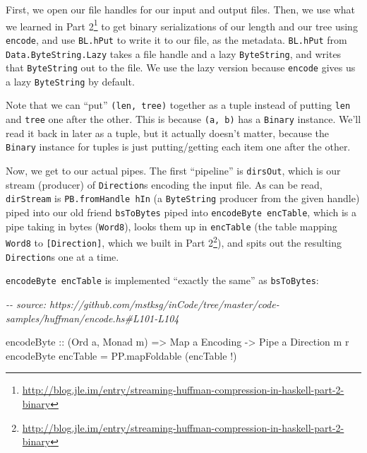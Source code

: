 \documentclass[]{article}
\newenvironment{Shaded}{}{}
\newcommand{\CommentTok}[1]{\textcolor[rgb]{0.38,0.63,0.69}{\textit{#1}}}
\newcommand{\DataTypeTok}[1]{\textcolor[rgb]{0.56,0.13,0.00}{#1}}
\newcommand{\NormalTok}[1]{#1}
\newcommand{\OperatorTok}[1]{\textcolor[rgb]{0.40,0.40,0.40}{#1}}
\newcommand{\OtherTok}[1]{\textcolor[rgb]{0.00,0.44,0.13}{#1}}
\renewcommand{\href}[2]{#2\footnote{\url{#1}}}
\begin{document}
First, we open our file handles for our input and output files. Then, we use
what we learned in
\href{http://blog.jle.im/entry/streaming-huffman-compression-in-haskell-part-2-binary}{Part
2} to get binary serializations of our length and our tree using
\texttt{encode}, and use \texttt{BL.hPut} to write it to our file, as the
metadata. \texttt{BL.hPut} from \texttt{Data.ByteString.Lazy} takes a file
handle and a lazy \texttt{ByteString}, and writes that \texttt{ByteString} out
to the file. We use the lazy version because \texttt{encode} gives us a lazy
\texttt{ByteString} by default.

Note that we can ``put'' \texttt{(len,\ tree)} together as a tuple instead of
putting \texttt{len} and \texttt{tree} one after the other. This is because
\texttt{(a,\ b)} has a \texttt{Binary} instance. We'll read it back in later as
a tuple, but it actually doesn't matter, because the \texttt{Binary} instance
for tuples is just putting/getting each item one after the other.

Now, we get to our actual pipes. The first ``pipeline'' is \texttt{dirsOut},
which is our stream (producer) of \texttt{Direction}s encoding the input file.
As can be read, \texttt{dirStream} is \texttt{PB.fromHandle\ hIn} (a
\texttt{ByteString} producer from the given handle) piped into our old friend
\texttt{bsToBytes} piped into \texttt{encodeByte\ encTable}, which is a pipe
taking in bytes (\texttt{Word8}), looks them up in \texttt{encTable} (the table
mapping \texttt{Word8} to \texttt{{[}Direction{]}}, which we built in
\href{http://blog.jle.im/entry/streaming-huffman-compression-in-haskell-part-2-binary}{Part
2}), and spits out the resulting \texttt{Direction}s one at a time.

\texttt{encodeByte\ encTable} is implemented ``exactly the same'' as
\texttt{bsToBytes}:

\begin{Shaded}
\begin{Highlighting}[]
\CommentTok{{-}{-} source: https://github.com/mstksg/inCode/tree/master/code{-}samples/huffman/encode.hs\#L101{-}L104}

\OtherTok{encodeByte ::}\NormalTok{ (}\DataTypeTok{Ord}\NormalTok{ a, }\DataTypeTok{Monad}\NormalTok{ m)}
           \OtherTok{=>} \DataTypeTok{Map}\NormalTok{ a }\DataTypeTok{Encoding}
           \OtherTok{{-}>} \DataTypeTok{Pipe}\NormalTok{ a }\DataTypeTok{Direction}\NormalTok{ m r}
\NormalTok{encodeByte encTable }\OtherTok{=}\NormalTok{ PP.mapFoldable (encTable }\OperatorTok{!}\NormalTok{)}
\end{Highlighting}
\end{Shaded}
\end{document}
